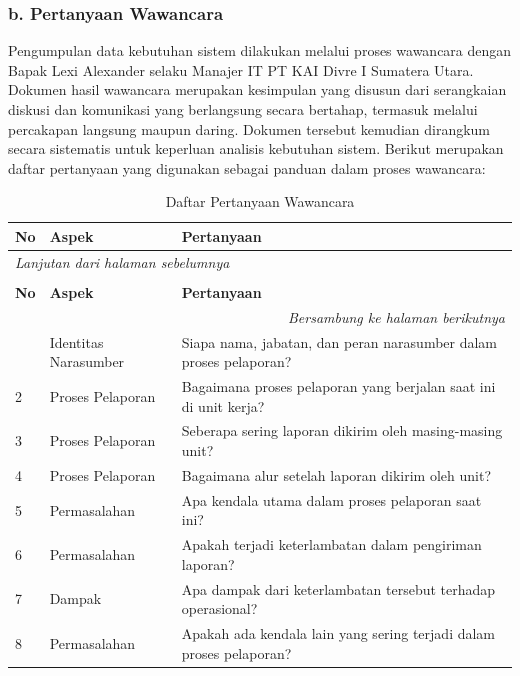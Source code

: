 \subsubsection*{b. Pertanyaan Wawancara}
Pengumpulan data kebutuhan sistem dilakukan melalui proses wawancara dengan Bapak Lexi Alexander selaku Manajer IT PT KAI Divre I Sumatera Utara. Dokumen hasil wawancara merupakan kesimpulan yang disusun dari serangkaian diskusi dan komunikasi yang berlangsung secara bertahap, termasuk melalui percakapan langsung maupun daring. Dokumen tersebut kemudian dirangkum secara sistematis untuk keperluan analisis kebutuhan sistem. Berikut merupakan daftar pertanyaan yang digunakan sebagai panduan dalam proses wawancara:

\begin{longtable}{|p{}|p{}|p{}|}
    \caption{Daftar Pertanyaan Wawancara}
    \label{table:3.wawancara}\\
    \hline
    \textbf{No} & \textbf{Aspek} & \textbf{Pertanyaan} \\
    \hline
    \endfirsthead
    \multicolumn{3}{l}{\textit{Lanjutan dari halaman sebelumnya}} \\
    \caption[]{Daftar Pertanyaan Wawancara} \\
    \hline
    \textbf{No} & \textbf{Aspek} & \textbf{Pertanyaan} \\
    \hline
    \endhead
    \hline
    \multicolumn{3}{r}{\textit{Bersambung ke halaman berikutnya}} \\
    \endfoot
    \endlastfoot
    1 & Identitas Narasumber & Siapa nama, jabatan, dan peran narasumber dalam proses pelaporan? \\
    \hline
    2 & Proses Pelaporan & Bagaimana proses pelaporan yang berjalan saat ini di unit kerja? \\
    \hline
    3 & Proses Pelaporan & Seberapa sering laporan dikirim oleh masing-masing unit? \\
    \hline
    4 & Proses Pelaporan & Bagaimana alur setelah laporan dikirim oleh unit? \\
    \hline
    5 & Permasalahan & Apa kendala utama dalam proses pelaporan saat ini? \\
    \hline
    6 & Permasalahan & Apakah terjadi keterlambatan dalam pengiriman laporan? \\
    \hline
    7 & Dampak & Apa dampak dari keterlambatan tersebut terhadap operasional? \\
    \hline
    8 & Permasalahan & Apakah ada kendala lain yang sering terjadi dalam proses pelaporan? \\

\end{longtable}

